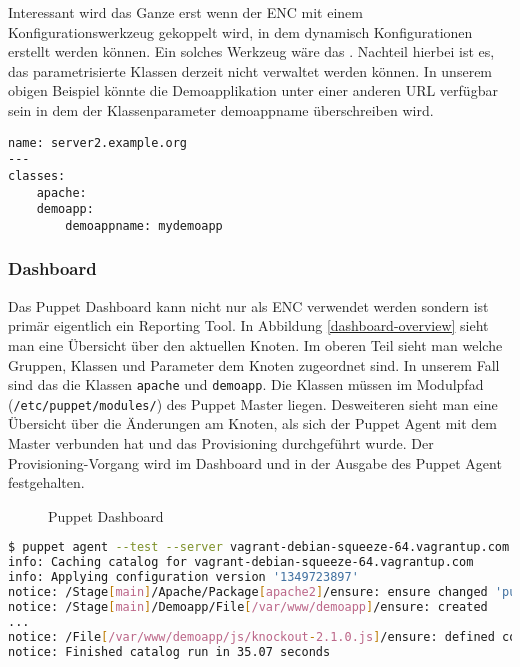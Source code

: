 \documentclass[12pt,a4paper,ngerman]{article}
\begin{document}
Interessant wird das Ganze erst wenn der ENC mit einem Konfigurationswerkzeug gekoppelt wird, in dem dynamisch Konfigurationen erstellt werden können. Ein solches Werkzeug wäre das \cite{puppetdashboard}. Nachteil hierbei ist es, das parametrisierte Klassen derzeit nicht verwaltet werden können. In unserem obigen Beispiel könnte die Demoapplikation unter einer anderen URL verfügbar sein in dem der Klassenparameter demoappname überschreiben wird.


\begin{lstlisting}[caption=ENC's YAML mit Klassenparameter , label=puppet-enc-yaml-param]
name: server2.example.org
---
classes: 
    apache:
    demoapp: 
        demoappname: mydemoapp
\end{lstlisting} 

\subsubsection{Dashboard}

Das Puppet Dashboard kann nicht nur als ENC verwendet werden sondern ist primär eigentlich ein Reporting Tool. In Abbildung \ref{dashboard-overview} sieht man eine Übersicht über den aktuellen Knoten. Im oberen Teil sieht man welche Gruppen, Klassen und Parameter dem Knoten zugeordnet sind. In unserem Fall sind das die Klassen \lstinline$apache$ und \lstinline$demoapp$. Die Klassen müssen im Modulpfad (\lstinline$/etc/puppet/modules/$) des Puppet Master liegen. Desweiteren sieht man eine Übersicht über die Änderungen am Knoten, als sich der Puppet Agent mit dem Master verbunden hat und das Provisioning durchgeführt wurde. Der Provisioning-Vorgang wird im Dashboard und in der Ausgabe des Puppet Agent festgehalten.
\begin{figure}[ht]
\centering
{}
\caption{Puppet Dashboard}
\label{dashboard}
\end{figure}

\begin{lstlisting}[language=sh,caption=Puppet Agent Run durchführen , label=puppet-agent-run]
$ puppet agent --test --server vagrant-debian-squeeze-64.vagrantup.com
info: Caching catalog for vagrant-debian-squeeze-64.vagrantup.com
info: Applying configuration version '1349723897'
notice: /Stage[main]/Apache/Package[apache2]/ensure: ensure changed 'purged' to 'present'
notice: /Stage[main]/Demoapp/File[/var/www/demoapp]/ensure: created
...
notice: /File[/var/www/demoapp/js/knockout-2.1.0.js]/ensure: defined content as '{md5}235475c7c3dc43c7cb7f6125be536c32'
notice: Finished catalog run in 35.07 seconds
\end{lstlisting}
\end{document}
